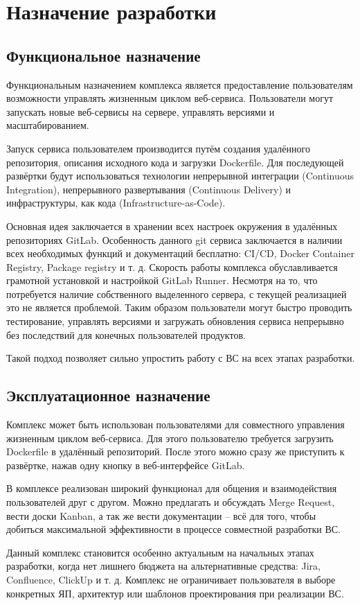 \section{Назначение разработки}

\subsection{Функциональное назначение}

Функциональным назначением комплекса является предоставление пользователям возможности управлять жизненным циклом веб-сервиса.
Пользователи могут запускать новые веб-сервисы на сервере, управлять версиями и масштабированием.

Запуск сервиса пользователем производится путём создания удалённого репозитория, описания исходного кода и загрузки Dockerfile.
Для последующей развёртки будут использоваться технологии непрерывной интеграции (Continuous Integration), непрерывного развертывания (Continuous Delivery) и инфраструктуры, как кода (Infrastructure-as-Code).

Основная идея заключается в хранении всех настроек окружения в удалённых репозиториях GitLab.
Особенность данного git сервиса заключается в наличии всех необходимых функций и документаций бесплатно: CI/CD, Docker Container Registry, Package registry и т. д.
Скорость работы комплекса обуславливается грамотной установкой и настройкой GitLab Runner.
Несмотря на то, что потребуется наличие собственного выделенного сервера, с текущей реализацией это не является проблемой.
Таким образом пользователи могут быстро проводить тестирование, управлять версиями и загружать обновления сервиса непрерывно без последствий для конечных пользователей продуктов.

Такой подход позволяет сильно упростить работу с ВС на всех этапах разработки.

\subsection{Эксплуатационное назначение}

Комплекс может быть использован пользователями для совместного управления жизненным циклом веб-сервиса.
Для этого пользователю требуется загрузить Dockerfile в удалённый репозиторий.
После этого можно сразу же приступить к развёртке, нажав одну кнопку в веб-интерфейсе GitLab.

В комплексе реализован широкий функционал для общения и взаимодействия пользователей друг с другом.
Можно предлагать и обсуждать Merge Request, вести доски Kanban, а так же вести документации -- всё для того, чтобы добиться максимальной эффективности в процессе совместной разработки ВС.

Данный комплекс становится особенно актуальным на начальных этапах разработки, когда нет лишнего бюджета на альтернативные средства: Jira, Confluence, ClickUp и т. д.
Комплекс не ограничивает пользователя в выборе конкретных ЯП, архитектур или шаблонов проектирования при реализации ВС.